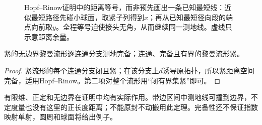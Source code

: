 \begin{figure}[htbp]
\centering
\caption{Hopf--Rinow证明中的距离等号，而非预先画出一条已知最短线：近似最短路径先碰小球面，取紧子列得到$x$；再从已知最短径向段的端点向前取$y$。全程等号迫使接头无角，从而继续同一测地线。虚线只示意距离余量。}
\label{fig:hopf-rinow-step}
\end{figure}

\begin{corollary}[紧流形与有界性]\label{cor:compact-riemannian-complete}
紧的无边界黎曼流形逐连通分支测地完备；连通、完备且有界的黎曼流形紧。
\end{corollary}
\begin{proof}
紧流形的每个连通分支闭且紧；在该分支上$d$诱导原拓扑，所以紧距离空间完备，适用Hopf--Rinow。第二项对整个流形用“闭有界集紧”即可。
\end{proof}

有限维、正定和无边界在证明中均有实际作用。带边区间中测地线可撞到边界，不定度量也没有这里的正长度距离；不能原封不动搬用此定理。完备性还不保证指数映射单射，圆周和球面将给出例子。

